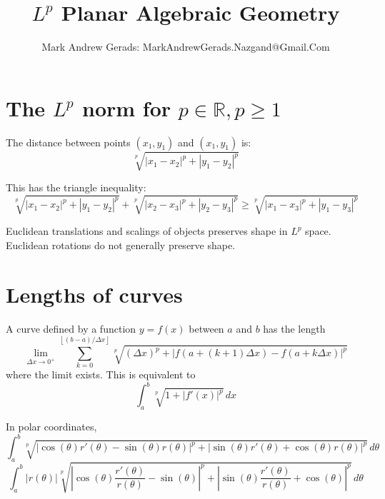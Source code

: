 \documentclass[]{article}
\title{$L^p$ Planar Algebraic Geometry}
\author{Mark Andrew Gerads: MarkAndrewGerads.Nazgand@Gmail.Com}
\newcommand{\paren}[1]{{\left(#1\right)}}
\newcommand{\abs}[1]{{\left\lvert#1\right\rvert}}
\newcommand{\floor}[1]{{\left\lfloor#1\right\rfloor}}
\begin{document}
\maketitle

\begin{abstract}

\end{abstract}

\section{The $L^p$ norm for $p\in\mathbb{R},p\geq 1$}
The distance between points $\paren{x_1,y_1}$ and $\paren{x_1,y_1}$ is:
\begin{equation}
\sqrt[p]{\abs{x_1-x_2}^p+\abs{y_1-y_2}^p}
\end{equation}

This has the triangle inequality:
\begin{equation}
\sqrt[p]{\abs{x_1-x_2}^p+\abs{y_1-y_2}^p}+
\sqrt[p]{\abs{x_2-x_3}^p+\abs{y_2-y_3}^p}\geq
\sqrt[p]{\abs{x_1-x_3}^p+\abs{y_1-y_3}^p}
\end{equation}

Euclidean translations and scalings of objects preserves shape in $L^p$ space. Euclidean rotations do not generally preserve shape.

\section{Lengths of curves}
A curve defined by a function $y=f\paren{x}$ between $a$ and $b$ has the length
\begin{equation}
\lim\limits_{\Delta x\rightarrow 0^+}\sum_{k=0}^{\floor{\paren{b-a}/\Delta x}}
\sqrt[p]{\paren{\Delta x}^p+\abs{f\paren{a+\paren{k+1}\Delta x}-f\paren{a+k\Delta x}}^p}
\end{equation}
where the limit exists. This is equivalent to
\begin{equation}
\int_{a}^{b}
\sqrt[p]{1+\abs{f'\paren{x}}^p} \,dx
\end{equation}

In polar coordinates,
\begin{equation}
\int_{a}^{b}
\sqrt[p]{\abs{\cos\paren{\theta}r'\paren{\theta}-\sin\paren{\theta}r\paren{\theta}}^p
	+\abs{\sin\paren{\theta}r'\paren{\theta}+\cos\paren{\theta}r\paren{\theta}}^p
} \,d\theta
\end{equation}
\begin{equation}
\label{CurveLengthPolar2}
\int_{a}^{b}
\abs{r\paren{\theta}}
\sqrt[p]{\abs{\cos\paren{\theta}\frac{r'\paren{\theta}}{r\paren{\theta}}-\sin\paren{\theta}}^p
	+\abs{\sin\paren{\theta}\frac{r'\paren{\theta}}{r\paren{\theta}}+\cos\paren{\theta}}^p
} \,d\theta
\end{equation}
\end{document}
